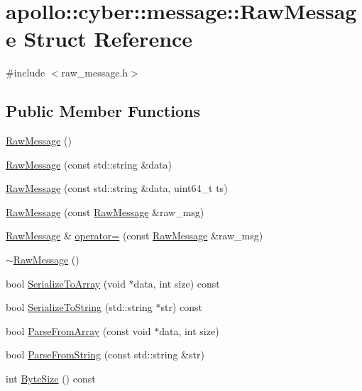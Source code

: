 \hypertarget{structapollo_1_1cyber_1_1message_1_1RawMessage}{\section{apollo\-:\-:cyber\-:\-:message\-:\-:Raw\-Message Struct Reference}
\label{structapollo_1_1cyber_1_1message_1_1RawMessage}
}


{\ttfamily \#include $<$raw\-\_\-message.\-h$>$}

\subsection*{Public Member Functions}
\begin{DoxyCompactItemize}
\item 
\hyperlink{structapollo_1_1cyber_1_1message_1_1RawMessage_af4805d2024c515f0e08f312f44ecf22c}{Raw\-Message} ()
\item 
\hyperlink{structapollo_1_1cyber_1_1message_1_1RawMessage_a5c79b3909630305786ef924b0ab1a664}{Raw\-Message} (const std\-::string \&data)
\item 
\hyperlink{structapollo_1_1cyber_1_1message_1_1RawMessage_a87730b4012212737703689f0ff53aada}{Raw\-Message} (const std\-::string \&data, uint64\-\_\-t ts)
\item 
\hyperlink{structapollo_1_1cyber_1_1message_1_1RawMessage_a3d990ec7c539b1c04adf1a3a61a21ea3}{Raw\-Message} (const \hyperlink{structapollo_1_1cyber_1_1message_1_1RawMessage}{Raw\-Message} \&raw\-\_\-msg)
\item 
\hyperlink{structapollo_1_1cyber_1_1message_1_1RawMessage}{Raw\-Message} \& \hyperlink{structapollo_1_1cyber_1_1message_1_1RawMessage_a052db1e8f7594a52a188d97b269d1c51}{operator=} (const \hyperlink{structapollo_1_1cyber_1_1message_1_1RawMessage}{Raw\-Message} \&raw\-\_\-msg)
\item 
\hyperlink{structapollo_1_1cyber_1_1message_1_1RawMessage_a46baa318c068a0ca6071d716a5651135}{$\sim$\-Raw\-Message} ()
\item 
bool \hyperlink{structapollo_1_1cyber_1_1message_1_1RawMessage_a97f5b764eb3fc7b41615d619bb77fe0c}{Serialize\-To\-Array} (void $\ast$data, int size) const 
\item 
bool \hyperlink{structapollo_1_1cyber_1_1message_1_1RawMessage_a1c16ef2d3e15d21824abcb3880ee3e90}{Serialize\-To\-String} (std\-::string $\ast$str) const 
\item 
bool \hyperlink{structapollo_1_1cyber_1_1message_1_1RawMessage_a886be8c74078e8a094672720db5300ab}{Parse\-From\-Array} (const void $\ast$data, int size)
\item 
bool \hyperlink{structapollo_1_1cyber_1_1message_1_1RawMessage_a31563a4a5686cbc5bc393ac245136fcf}{Parse\-From\-String} (const std\-::string \&str)
\item 
int \hyperlink{structapollo_1_1cyber_1_1message_1_1RawMessage_ae8f793a83d385304bf88f94c2a08c798}{Byte\-Size} () const 
\end{DoxyCompactItemize}
